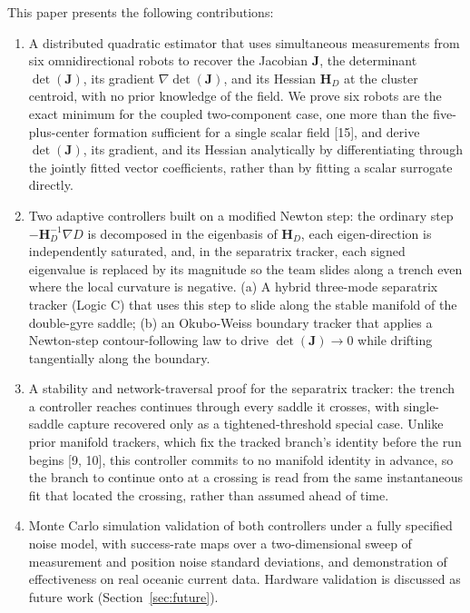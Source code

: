 \documentclass[lettersize,journal]{IEEEtran}
\begin{document}
This paper presents the following contributions:
\begin{enumerate}
    \item A distributed quadratic estimator that uses simultaneous measurements
          from six omnidirectional robots to recover the Jacobian $\mathbf{J}$,
          the determinant $\det(\mathbf{J})$, its gradient
          $\nabla\det(\mathbf{J})$, and its Hessian $\mathbf{H}_D$ at the cluster
          centroid, with no prior knowledge of the field. We prove six robots
          are the exact minimum for the coupled two-component case, one more
          than the five-plus-center formation sufficient for a single scalar
          field [15], and derive $\det(\mathbf{J})$, its gradient, and its
          Hessian analytically by differentiating through the jointly fitted
          vector coefficients, rather than by fitting a scalar surrogate
          directly.
    \item Two adaptive controllers built on a modified Newton step: the
          ordinary step $-\mathbf{H}_D^{-1}\nabla D$ is decomposed in the
          eigenbasis of $\mathbf{H}_D$, each eigen-direction is independently
          saturated, and, in the separatrix tracker, each signed eigenvalue is
          replaced by its magnitude so the team slides along a trench even
          where the local curvature is negative. (a) A hybrid three-mode
          separatrix tracker (Logic C) that uses this step to slide along the
          stable manifold of the double-gyre saddle; (b) an Okubo-Weiss
          boundary tracker that applies a Newton-step contour-following law to
          drive $\det(\mathbf{J}) \to 0$ while drifting tangentially along the
          boundary.
    \item A stability and network-traversal proof for the separatrix tracker:
          the trench a controller reaches continues through every saddle it
          crosses, with single-saddle capture recovered only as a
          tightened-threshold special case. Unlike prior manifold trackers,
          which fix the tracked branch's identity before the run begins
          [9, 10], this controller commits to no manifold identity in
          advance, so the branch to continue onto at a crossing is read from
          the same instantaneous fit that located the crossing, rather than
          assumed ahead of time.
    \item Monte Carlo simulation validation of both controllers under a fully
          specified noise model, with success-rate maps over a two-dimensional
          sweep of measurement and position noise standard deviations, and
          demonstration of effectiveness on real oceanic current data.
          Hardware validation is discussed as future work
          (Section~\ref{sec:future}).
\end{enumerate}
\end{document}
